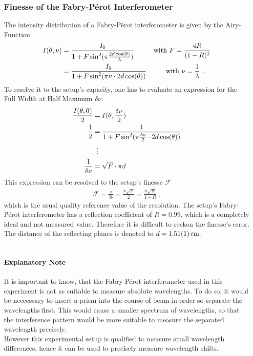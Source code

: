 \subsubsection{Finesse of the Fabry-P\'erot Interferometer}
\label{toc:FPIFinesse}
The intensity distribution of a Fabry-P\'erot interferometer is given by the Airy-Function
\begin{align}
	\begin{split}
	I(\theta,\nu)	 	&=\frac{I_0}{1 + F\sin^2(\pi\frac{2d\cos(\theta)}{\lambda})}	\hspace{1.0cm}\text{with } F=\frac{4R}{(1-R)^2}\\
				&=\frac{I_0}{1 + F\sin^2(\pi\nu\cdot2d\cos(\theta))}		\hspace{1.0cm}\text{with } \nu=\frac{1}{\lambda}\ .
	\end{split}
\end{align}
To resolve it to the setup's capacity, one has to evaluate an expression for the Full Width at Half Maximum $\delta \nu$.
\begin{align}
	\begin{split}
	\frac{I(\theta,0)}{2} 	&= I(\theta, \frac{\delta \nu}{2}) \\
	\frac{1}{2}		&= \frac{1}{1 + F \sin^2(\pi \frac{\delta \nu}{2} \cdot 2d \cos(\theta))}\\
				&\mathrel{\makebox[\widthof{=}]{\vdots}} \\
	\frac{1}{\delta \nu}	&= \sqrt{F}\cdot\pi d
	\end{split}
\end{align}
This expression can be resolved to the setup's finesse $\mathcal{F}$
\begin{align}
	\label{eq:FPIFinesse}
	\mathcal{F} = \frac{\nu}{\delta\nu} = \frac{\pi\sqrt{F}}{2} = \frac{\pi \sqrt{R}}{1-R}\ ,
\end{align}
which is the usual quality reference value of the resolution.
The setup's Fabry-P\'erot interferometer has a reflection coefficient of $R=\num{0.99}$, which is a completely ideal and not measured value.
Therefore it is difficult to reckon the finesse's error.
The distance of the reflecting planes is denoted to $d=\SI{1.51\pm 0.01}{\centi\meter}$.\\
\\
\\
\textbf{Explanatory Note}\\
\\
It is important to know, that the Fabry-P\'erot interferometer used in this experiment is not as suitable to measure absolute wavelengths. 
To do so, it would be neccessary to insert a prism into the course of beam in order so separate the wavelengths first. 
This would cause a smaller spectrum of wavelengths, so that the interference pattern would be more suitable to measure the separated wavelength precisely.\\
However this experimental setup is qualified to measure small wavelength differences, hence it can be used to precisely measure wavelength shifts.
